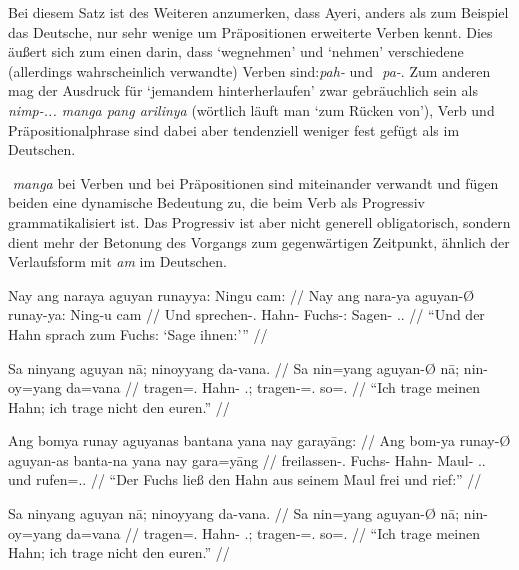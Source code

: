 \documentclass[12pt,paper=a4]{scrartcl}
\newcommand{\TsgM}{{\Tsg}.{\M}}
\newcommand{\TplM}{{\Tpl}.{\M}}
\newcommand{\fw}[1]{\textit{#1}} %
\newcommand{\zwsp}{\mbox{​}} %
\newcommand{\rayr}[2]{\zwsp\smash{{\Tagati #1}} \emph{#2}} %
\begin{document}
Bei diesem Satz ist des Weiteren anzumerken, dass Ayeri, anders als zum Beispiel das Deutsche, nur sehr wenige um Präpositionen erweiterte Verben kennt. Dies äußert sich zum einen darin, dass `wegnehmen' und `nehmen' verschiedene (allerdings wahrscheinlich verwandte) Verben sind: \rayr{phF/}{pah-} und \rayr{p/}{pa-}. Zum anderen mag der Ausdruck für `jemandem hinterherlaufen' zwar gebräuchlich sein als \rayr{niMpF/— mN pNF ArilinFy}{nimp-... manga pang arilinya} (wörtlich läuft man `zum Rücken von'), Verb und Präpositionalphrase sind dabei aber tendenziell weniger fest gefügt als im Deutschen.

\rayr{mN}{manga} bei Verben und bei Präpositionen sind miteinander verwandt und fügen beiden eine dynamische Bedeutung zu, die beim Verb als Progressiv grammatikalisiert ist. Das Progressiv ist aber nicht generell obligatorisch, sondern dient mehr der Betonung des Vorgangs zum gegenwärtigen Zeitpunkt, ähnlich der Verlaufsform mit \fw{am} im Deutschen.

\pex %
\a\begingl
	\gla Nay ang naraya aguyan runayya: Ningu cam: //
	\glb Nay ang nara-ya aguyan-Ø runay-ya: Ning-u cam //
	\glc Und \AgtT{} sprechen-\TsgM{} Hahn-\Top{} Fuchs-\Loc{}: Sagen-\Imp{} \TplM{}.\Dat{} //
	\glft \enquote{Und der Hahn sprach zum Fuchs: \enquote{Sage ihnen:}} //
\endgl

\a\begingl
	\gla Sa ninyang aguyan nā; ninoyyang da-vana. //
	\glb Sa nin=yang aguyan-Ø nā; nin-oy=yang da=vana //
	\glc \PatT{} tragen=\Fsg{}.\Aarg{} Hahn-\Top{} \Fsg{}.\Gen{}; tragen-\Neg{}=\Fsg{}.\Aarg{} so=\Spl{}.\Gen{} //
	\glft \enquote{Ich trage meinen Hahn; ich trage nicht den euren.} //
\endgl

\xe

\pex %
\a\begingl
	\gla Ang bomya runay aguyanas bantana yana nay garayāng: //
	\glb Ang bom-ya runay-Ø aguyan-as banta-na yana nay gara=yāng //
	\glc \AgtT{} freilassen-\TsgM{} Fuchs-\Top{} Hahn-\Parg{} Maul-\Gen{} \TsgM{}.\Gen{} und rufen=\TsgM{}.\Aarg{} //
	\glft \enquote{Der Fuchs ließ den Hahn aus seinem Maul frei und rief:} //
\endgl

\a\begingl
	\gla Sa ninyang aguyan nā; ninoyyang da-vana. //
	\glb Sa nin=yang aguyan-Ø nā; nin-oy=yang da=vana //
	\glc \PatT{} tragen=\Fsg{}.\Aarg{} Hahn-\Top{} \Fsg{}.\Gen{}; tragen-\Neg{}=\Fsg{}.\Aarg{} so=\Spl{}.\Gen{} //
	\glft \enquote{Ich trage meinen Hahn; ich trage nicht den euren.} //
\endgl

\xe
\end{document}
